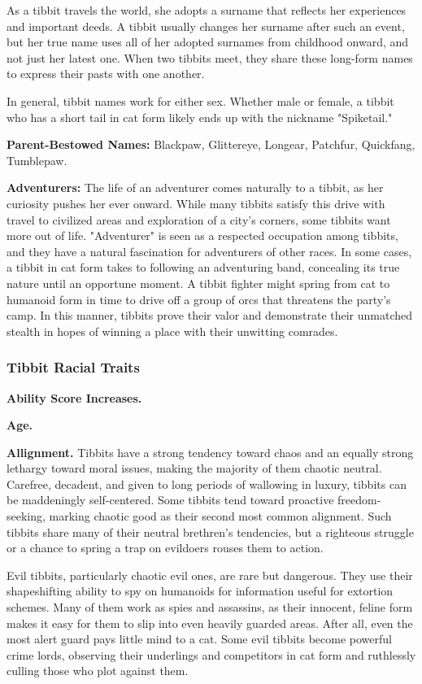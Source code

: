 As a tibbit travels the world, she adopts a surname that reflects her experiences and important deeds. A tibbit usually changes her surname after such an event, but
her true name uses all of her adopted surnames from childhood onward, and not just her latest one. When two tibbits meet, they share these long-form names to express
their pasts with one another.

In general, tibbit names work for either sex. Whether male or female, a tibbit who has a short tail in cat form likely ends up with the nickname "Spiketail."

\textbf{Parent-Bestowed Names:} Blackpaw, Glittereye, Longear, Patchfur, Quickfang, Tumblepaw.

\textbf{Adventurers:} The life of an adventurer comes naturally to a tibbit, as her curiosity pushes her ever onward. While many tibbits satisfy this drive with travel to civilized areas and exploration of a city's corners, some tibbits want more out of life. "Adventurer" is seen as a respected occupation among tibbits, and they have a natural fascination for adventurers of other races. In some cases, a tibbit in cat form takes to following an adventuring band, concealing its true nature until an opportune moment. A tibbit fighter might spring from cat to humanoid form in time to drive off a group of orcs that threatens the party's camp. In this manner, tibbits prove their valor and demonstrate their unmatched stealth in hopes of winning a place with their unwitting comrades.

\subsubsection{Tibbit Racial Traits}
\textbf{Ability Score Increases.}

\textbf{Age.}

\textbf{Allignment.} Tibbits have a strong tendency toward chaos and an equally strong lethargy toward moral issues, making the majority of them chaotic neutral. Carefree, decadent, and given to long periods of wallowing in luxury, tibbits can be maddeningly self-centered. Some tibbits tend toward proactive freedom-seeking, marking chaotic good as their second most common alignment. Such tibbits share many of their neutral brethren's tendencies, but a righteous struggle or a chance to spring a trap on evildoers rouses them to action.

Evil tibbits, particularly chaotic evil ones, are rare but dangerous. They use their shapeshifting ability to spy on humanoids for information useful for extortion
schemes. Many of them work as spies and assassins, as their innocent, feline form makes it easy for them to slip into even heavily guarded areas. After all, even the
most alert guard pays little mind to a cat. Some evil tibbits become powerful crime lords, observing their underlings and competitors in cat form and ruthlessly
culling those who plot against them.

